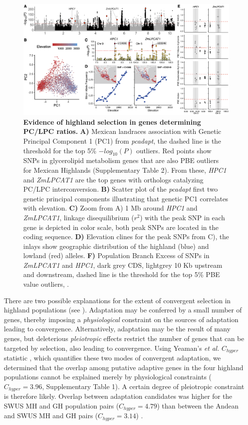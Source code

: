 \documentclass[9pt,twocolumn,twoside,lineno]{biorxiv}
\newcommand{\hpc}{\textit{HPC1}\xspace}
\begin{document}
\begin{figure}[ht]
\begin{center}
\includegraphics[width=0.8\paperwidth]{Figures/Fig_2.png}
\caption{\textbf{Evidence of highland selection in genes determining PC/LPC ratios.}
 \textbf{A)} Mexican landraces association with Genetic Principal Component 1 (PC1) from \textit{pcadapt}, the dashed line is the threshold for the top 5\% $-log_{10}(P)$ outliers. 
 Red points show SNPs in glycerolipid metabolism genes that are also PBE outliers for Mexican Highlands (Supplementary Table 2). 
 From these, \hpc and \textit{ZmLPCAT1} are the top genes with orthologs catalyzing PC/LPC interconversion. 
 \textbf{B)} Scatter plot of the \textit{pcadapt} first two genetic principal components illustrating that genetic PC1 correlates with elevation.
 \textbf{C)} Zoom from A) 1 Mb around \hpc and \textit{ZmLPCAT1}, linkage disequilibrium ($r^2$) with the peak SNP in each gene is depicted in color scale, both peak SNPs are located in the coding sequence. 
 \textbf{D)} Elevation clines for the peak SNPs from C), the inlays show  geographic distribution of the highland (blue) and lowland (red) alleles.
\textbf{F)} Population Branch Excess of SNPs in \textit{ZmLPCAT1} and \hpc, dark grey CDS, lightgrey 10 Kb upstream and downstream, dashed line is the threshold for the top 5\% PBE value outliers, .} 
\label{Fig2}
\end{center}
\end{figure}

There are two possible explanations for the extent of convergent selection in highland populations (see \cite{Wang2020-mp, yeaman2018}). 
Adaptation may be conferred by a small number of genes, thereby imposing a \textit{physiological} constraint on the sources of adaptation leading to convergence. 
Alternatively, adaptation may be the result of many genes, but deleterious \textit{pleiotropic} effects restrict the number of genes that can be targeted by selection, also leading to convergence.  
Using Yeaman's \textit{et al.} $C_{hyper}$ statistic \cite{yeaman2018}, which quantifies these two modes of convergent adaptation, we determined that the overlap among putative adaptive genes in the four highland populations cannot be explained merely by physiological constraints ($C_{hyper} = 3.96$, Supplementary Table 1). 
A certain degree of pleiotropic constraint is therefore likely.
Overlap between adaptation candidates was higher for the SWUS MH and GH population pairs ($C_{hyper} = 4.79$) than between the Andean and SWUS MH and GH pairs ($C_{hyper} = 3.14$) .
\end{document}
